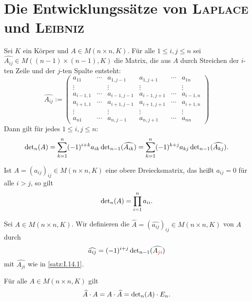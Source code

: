 \section{Die Entwicklungssätze von \textsc{Laplace} und \textsc{Leibniz}}

\begin{satz}
	\label{satz:I.14.1}
	Sei $K$ ein Körper und $A \in M(n \times n,K)$.
	Für alle $1 \leq i,j \leq n$ sei $\widehat{A_{ij}} \in M((n-1)\times(n-1),K)$ die Matrix, die aus $A$ durch Streichen der $i$-ten Zeile und der $j$-ten Spalte entsteht: 
	\[
		\widehat{A_{ij}} := \begin{pmatrix}
		a_11 & \cdots & a_{1,j-1} & a_{1,j+1} & \cdots & a_{1n} \\ 
		\vdots &  & \vdots & \vdots &  & \vdots \\ 
		a_{i-1,1} & \cdots & a_{i-1,j-1} & a_{i-1,j+1} & \cdots & a_{i-1,n} \\ 
		a_{i+1,1} & \cdots & a_{i+1,j-1} & a_{i+1,j+1} & \cdots & a_{i+1,n} \\ 
		\vdots &  & \vdots & \vdots &  & \vdots \\ 
		a_{n1} & \cdots & a_{n,j-1} & a_{n,j+1} & \cdots & a_{nn}
		\end{pmatrix} 
	\]
	Dann gilt für jedes $1 \leq i,j \leq n$:
	\[
		\operatorname{\det\,\!}_n(A) = \sum_{k=1}^{n} (-1)^{i+k} a_{ik} \operatorname{\det\,\!}_{n-1}(\widehat{A_{ik}}) = \sum_{k=1}^{n} (-1)^{k+j} a_{kj} \operatorname{\det\,\!}_{n-1}(\widehat{A_{kj}}).
	\]
\end{satz}

\setcounter{definition}{3}
\begin{korollar}
	\label{kor:I.14.4}
	Ist $A = (a_{ij})_{ij} \in M(n \times n,K)$ eine obere Dreiecksmatrix, das heißt $a_{ij} = 0$ für alle $i > j$, so gilt
	\[
		\operatorname{\det\,\!}_n(A) = \prod_{i=1}^{n} a_{ii}.
	\]
\end{korollar}

\begin{definition}[Adjunkte]
	\label{def:I.14.5}
	Sei $A \in M(n \times n,K)$. Wir definieren die  $\widehat{A} = (\widehat{a_{ij}})_{ij} \in M(n \times n,K)$ von $A$ durch
	\[
		\widehat{a_{ij}} = (-1)^{i+j} \operatorname{\det\,\!}_{n-1}(\widehat{A_{\textcolor{red}{ji}}})
	\]
	mit $\widehat{A_{ji}}$ wie in \autoref{satz:I.14.1}.
\end{definition}

\begin{satz}
	\label{satz:I.14.6}
	Für alle $A \in M(n \times n,K)$ gilt
	\[
		\widehat{A} \cdot A = A  \cdot \widehat{A} = \operatorname{\det\,\!}_n(A) \cdot E_n.
	\]
\end{satz}

